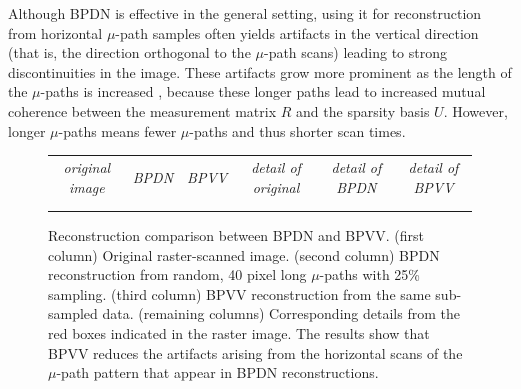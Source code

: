 \documentclass[twocolumn,oneside]{IEEEtran/IEEEtran}
\begin{document}
Although BPDN is effective in the general setting, using it for reconstruction
from horizontal $\mu$-path samples often yields artifacts in the vertical
direction (that is, the direction orthogonal to the $\mu$-path scans) leading to
strong discontinuities in the image. These artifacts grow more prominent as the
length of the $\mu$-paths is increased \cite{maxwell2014compressed}, because these
longer paths lead to increased mutual coherence between the measurement matrix
$R$ and the sparsity basis $U$. However, longer $\mu$-paths means fewer
$\mu$-paths and thus shorter scan times.
\noindent 
\begingroup \setlength{\tabcolsep}{1pt}
\begin{figure}[ht!]
  \centering
  \begin{tabular}{cccccc}
    \textit{\small original image} & \textit{\small BPDN} & \textit{\small BPVV}
    & \textit{\small detail of original} & \textit{\small detail of BPDN} & \textit{\small detail of BPVV} \\
    
    & 
    & 
    & 
    & 
    & \\
    
    & 
    & 
    & 
    & 
    & 
  \end{tabular}
  \caption{Reconstruction comparison between BPDN and BPVV. (first column)
    Original raster-scanned image. (second column) BPDN reconstruction from
    random, 40 pixel long $\mu$-paths with 25\% sampling. (third column) BPVV
    reconstruction from the same sub-sampled data. (remaining columns)
    Corresponding details from the red boxes indicated in the raster image. The
    results show that BPVV reduces the artifacts arising from the horizontal
    scans of the $\mu$-path pattern that appear in BPDN reconstructions.}
  \label{fig:BPTV_demonstration}
\end{figure}
\endgroup
\end{document}
